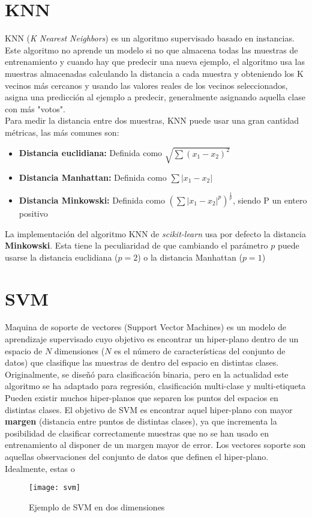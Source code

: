 \section{KNN}
\label{alg:knn}
KNN (\textit{K Nearest Neighbors}) es un algoritmo supervisado basado en instancias. Este algoritmo no aprende un modelo si no que almacena todas las muestras de entrenamiento y cuando hay que predecir una nueva ejemplo, el algoritmo usa las muestras almacenadas calculando la distancia a cada muestra y obteniendo los K vecinos más cercanos y usando las valores reales de los vecinos seleccionados, asigna una predicción al ejemplo a predecir, generalmente asignando aquella clase con más "votos".\\
\linebreak
Para medir la distancia entre dos muestras, KNN puede usar una gran cantidad métricas, las más comunes son:
\begin{itemize}
	\item \textbf{Distancia euclidiana:} Definida como $\sqrt{\sum(x_1 - x_2)^2}$
	\item \textbf{Distancia Manhattan:} Definida como $\sum|x_1 - x_2|$
	\item \textbf{Distancia Minkowski:} Definida como $(\sum|x_1 - x_2|^p)^{\frac{1}{p}}$, siendo P un entero positivo
\end{itemize}
La implementación del algoritmo KNN de \textit{scikit-learn} usa por defecto la distancia \textbf{Minkowski}. Esta tiene la peculiaridad de que cambiando el parámetro $p$ puede usarse la distancia euclidiana ($p=2$) o la distancia Manhattan ($p=1$)
\section{SVM}
\label{alg:svm}
Maquina de soporte de vectores (Support Vector Machines) es un modelo de aprendizaje supervisado cuyo objetivo es encontrar un hiper-plano dentro de un espacio de $N$ dimensiones ($N$ es el número de características del conjunto de datos) que clasifique las muestras de dentro del espacio en distintas clases. Originalmente, se diseñó para clasificación binaria, pero en la actualidad este algoritmo se ha adaptado para regresión, clasificación multi-clase y multi-etiqueta\\
\linebreak
Pueden existir muchos hiper-planos que separen los puntos del espacios en distintas clases. El objetivo de SVM es encontrar aquel hiper-plano con mayor \textbf{margen} (distancia entre puntos de distintas clases), ya que incrementa la posibilidad de clasificar correctamente muestras que no se han usado en entrenamiento al disponer de un margen mayor de error. Los vectores soporte son aquellas observaciones del conjunto de datos que definen el hiper-plano. Idealmente, estas o\\
\begin{figure}[H]
	\centering
	\texttt{[image: svm]}
	\caption{Ejemplo de SVM en dos dimensiones}
	\label{fig:svm}
\end{figure}
